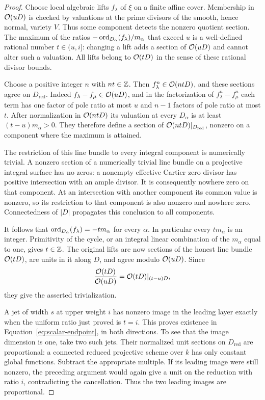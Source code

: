 \begin{proof}
Choose local algebraic lifts $f_\lambda$ of $\xi$ on a finite
affine cover. Membership in $\mathcal O(uD)$ is checked by valuations
at the prime divisors of the smooth, hence normal, variety $V$.
Thus some component detects the nonzero quotient section. The
maximum of the ratios
$-\operatorname{ord}_{D_\alpha}(f_\lambda)/m_\alpha$ that exceed $u$ is a
well-defined rational number $t\in(u,i]$: changing a lift adds
a section of $\mathcal O(uD)$ and cannot alter such a valuation.
All lifts belong to $\mathcal O(tD)$ in the sense of these rational
divisor bounds.

Choose a positive integer $n$ with $nt\in\mathbb Z$. Then
$f_\lambda^n\in\mathcal O(ntD)$, and these sections agree on
$D_{\mathrm{red}}$. Indeed
$f_\lambda-f_\mu\in\mathcal O(uD)$, and in the factorization of
$f_\lambda^n-f_\mu^n$ each term has one factor of pole ratio
at most $u$ and $n-1$ factors of pole ratio at most $t$.
After normalization in $\mathcal O(ntD)$ its valuation at every
$D_\alpha$ is at least $(t-u)m_\alpha>0$.
They therefore define a section of
$\mathcal O(ntD)|_{D_{\mathrm{red}}}$, nonzero on a component where
the maximum is attained.

The restriction of this line bundle to every integral component
is numerically trivial. A nonzero section of a numerically
trivial line bundle on a projective integral surface has no
zeros: a nonempty effective Cartier zero divisor has positive
intersection with an ample divisor. It is consequently nowhere
zero on that component. At an intersection with another
component its common value is nonzero, so its restriction to
that component is also nonzero and nowhere zero. Connectedness
of $|D|$ propagates this conclusion to all components.

It follows that $\operatorname{ord}_{D_\alpha}(f_\lambda)=-tm_\alpha$
for every $\alpha$. In particular every $tm_\alpha$ is an
integer. Primitivity of the cycle, or an integral linear
combination of the $m_\alpha$ equal to one, gives $t\in\mathbb Z$.
The original lifts are now sections of the honest line bundle
$\mathcal O(tD)$, are units in it along $D$, and agree modulo
$\mathcal O(uD)$. Since
\[
 \frac{\mathcal O(tD)}{\mathcal O(uD)}
 =\mathcal O(tD)|_{(t-u)D},
\]
they give the asserted trivialization.

A jet of width $s$ at upper weight $i$ has nonzero image in
the leading layer exactly when the uniform ratio just proved
is $t=i$. This proves existence in
Equation~\ref{eq:scalar-endpoint}, in both directions.
To see that the image dimension is one, take two such jets.
Their normalized unit sections on $D_{\mathrm{red}}$ are
proportional: a connected reduced projective scheme over $k$
has only constant global functions. Subtract the appropriate
multiple. If its leading image were still nonzero, the preceding
argument would again give a unit on the reduction with ratio
$i$, contradicting the cancellation. Thus the two leading
images are proportional.
\end{proof}

